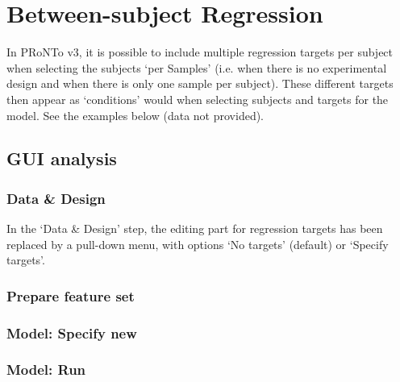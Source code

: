 
\chapter{Between-subject Regression}
\label{between_subject_regression}
\minitoc

In PRoNTo v3, it is possible to include multiple regression targets per subject when selecting the subjects `per Samples' (i.e. when there is no experimental design and when there is only one sample per subject). These different targets then appear as `conditions' would when selecting subjects and targets for the model. See the examples below (data not provided).

\section{GUI analysis}


\subsection{Data \& Design}

In the `Data \& Design' step, the editing part for regression targets has been replaced by a pull-down menu, with options `No targets' (default) or `Specify targets'.



\subsection{Prepare feature set}



\subsection{Model: Specify new}



\subsection{Model: Run}



